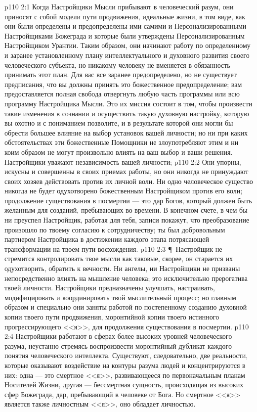 \vs p110 2:1 Когда Настройщики Мысли прибывают в человеческий разум, они приносят с собой модели пути продвижения, идеальные жизни, в том виде, как они были определены и предопределены ими самими и Персонализированными Настройщиками Божеграда и которые были утверждены Персонализированным Настройщиком Урантии. Таким образом, они начинают работу по определенному и заранее установленному плану интеллектуального и духовного развития своего человеческого субъекта, но никакому человеку не вменяется в обязанность принимать этот план. Для вас все заранее предопределено, но не существует предписания, что вы должны принять это божественное предопределение; вам предоставляется полная свобода отвергнуть любую часть программы или всю программу Настройщика Мысли. Это их миссия состоит в том, чтобы произвести такие изменения в сознании и осуществить такую духовную настройку, которую вы охотно и с пониманием позволите, и в результате которой они могли бы обрести большее влияние на выбор установок вашей личности; но ни при каких обстоятельствах эти божественные Помощники не злоупотребляют этим и ни коим образом не могут произвольно влиять на ваш выбор и ваши решения. Настройщики уважают независимость вашей личности; 
\vs p110 2:2 Они упорны, искусны и совершенны в своих приемах работы, но они никогда не принуждают своих хозяев действовать против их личной воли. Ни одно человеческое существо никогда не будет одухотворено божественным Настройщиком против его воли; продолжение существования в посмертии --- это дар Богов, который должен быть желанным для созданий, пребывающих во времени. В конечном счете, в чем бы ни преуспел Настройщик, работая для тебя, записи покажут, что преобразование произошло по твоему согласию к сотрудничеству; ты был добровольным партнером Настройщика в достижении каждого этапа потрясающей трансформации на твоем пути восхождения.
\vs p110 2:3 \P\ Настройщик не стремится контролировать твое мысли как таковые, скорее, он старается их одухотворить, обратить к вечности. Ни ангелы, ни Настройщики не призваны непосредственно влиять на мышление человека; это исключительно прерогатива твоей личности. Настройщики предназначены улучшать, настраивать, модифицировать и координировать твой мыслительный процесс; но главным образом и специально они заняты работой по постепенному созданию духовной копии твоего пути продвижения, моронтийной копии твоего истинного прогрессирующего <<я>>, для продолжения существования в посмертии.
\vs p110 2:4 Настройщики работают в сферах более высоких уровней человеческого разума, неустанно стремясь воспроизвести моронтийный дубликат каждого понятия человеческого интеллекта. Существуют, следовательно, две реальности, которые оказывают воздействие на контуры разума людей и концентрируются в них: одна --- это смертное <<я>>, развивающееся по первоначальным планам Носителей Жизни, другая --- бессмертная сущность, происходящая из высоких сфер Божеграда, дар, пребывающий в человеке от Бога. Но смертное <<я>> является также личностным <<я>>, оно обладает личностью.
